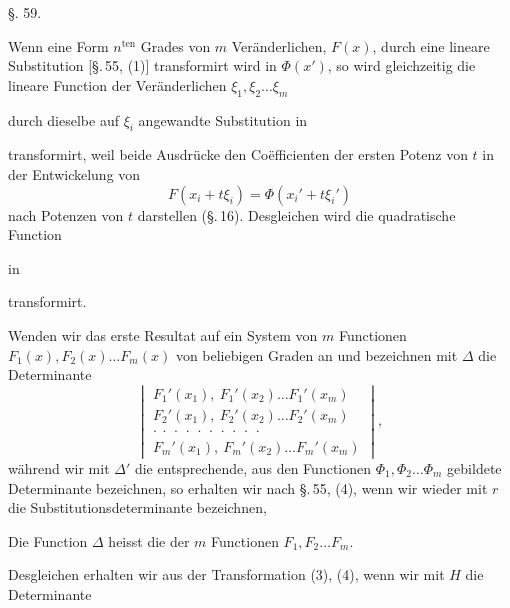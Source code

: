 
\begin{center}
§. 59.

\end{center}

Wenn eine Form $n^{\mathrm{ten}}$ Grades von $m$ Veränderlichen, $F(x)$, durch eine lineare Substitution [\S.\,55, (1)] transformirt wird in $\Phi(x')$, so wird gleichzeitig die lineare Function der Veränderlichen $\xi_1, \xi_2 \ldots \xi_m$


durch dieselbe auf $\xi_i$ angewandte Substitution in


transformirt, weil beide Ausdrücke den Co\"efficienten der ersten Potenz von $t$ in der Entwickelung von
\[
F(x_i + t\xi_i) = \Phi(x_i' + t\xi_i')
\]
nach Potenzen von $t$ darstellen (\S.\,16). Desgleichen wird die quadratische Function


in


transformirt.

Wenden wir das erste Resultat auf ein System von $m$ Functionen $F_1(x), F_2(x) \ldots F_m(x)$ von beliebigen Graden an und bezeichnen mit $\varDelta$ die Determinante
\[
\begin{vmatrix}
F_1'(x_1),\ F_1'(x_2) \ldots F_1'(x_m) \\
F_2'(x_1),\ F_2'(x_2) \ldots F_2'(x_m) \\
\cdot\ \cdot\ \cdot\ \cdot\ \cdot\ \cdot\ \cdot\ \cdot\ \cdot\ \cdot \\
F_m'(x_1),\ F_m'(x_2) \ldots F_m'(x_m)
\end{vmatrix}\! ,
\]
während wir mit $\varDelta'$ die entsprechende, aus den Functionen $\Phi_1, \Phi_2 \ldots \Phi_m$ gebildete Determinante bezeichnen, so erhalten wir nach \S.\,55, (4), wenn wir wieder mit $r$ die Substitutionsdeterminante bezeichnen,


Die Function $\varDelta$ heisst die  der $m$ Functionen $F_1, F_2 \ldots F_m$.

Desgleichen erhalten wir aus der Transformation (3), (4), wenn wir mit $H$ die Determinante
